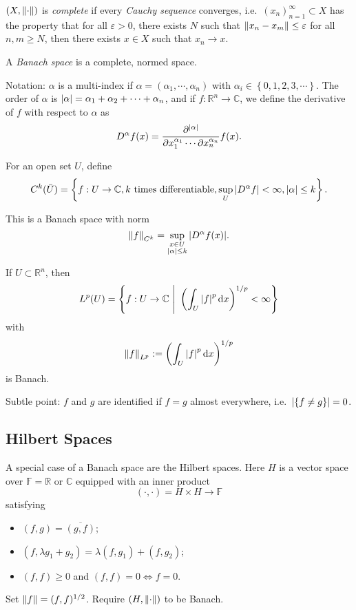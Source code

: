 \documentclass[a4paper,11pt]{article}
\begin{document}
	\begin{defi}
		$(X, \norm{\cdot})$ is \emph{complete} if every \emph{Cauchy sequence} converges, i.e.\ $(x_n)_{n = 1}^{\infty} \subset X$ has the property that for all $\varepsilon > 0$, there exists $N$ such that $\norm{x_n - x_m} \leq \varepsilon$ for all $n,m \geq N$, then there exists $x \in X$ such that $x_n \to x$.  
	\end{defi}

	\begin{defi}
		A \emph{Banach space} is a complete, normed space.
	\end{defi}

	\begin{ex}
		Notation: $\alpha$ is a multi-index if $\alpha = (\alpha_1, \cdots, \alpha_n)$ with $\alpha_i \in \left\{ 0,1,2,3,\cdots \right\}$. The order of $\alpha$ is $\abs{\alpha} = \alpha_1 + \alpha_2 + \cdots + \alpha_n$, and if $f : \mathbb{R}^n \to \mathbb{C}$, we define the derivative of $f$ with respect to $\alpha$ as 
		\[
			D^\alpha f(x) = \frac{\partial ^{\abs{\alpha}}}{\partial x_1 ^{\alpha_1} \cdots \partial x_n ^{\alpha_n}} f(x).
		\]
		 
		For an open set $U$, define
		\[
			C^k (\bar U) = \left\{ f: U \to \mathbb{C}, \text{$k$ times differentiable}, \sup_U \abs{D^\alpha f} < \infty, \abs{\alpha} \leq k\right\}.
		\]

		This is a Banach space with norm 
		\[
			\norm{f}_{C^k} = \sup _{\substack{x\in U\\\abs{\alpha}\leq k}} \abs{D^\alpha f(x)}.
		\]
	\end{ex}

	\begin{ex}
		If $U \subset \mathbb{R}^n$, then 
		\[
			L^p (U) = \left\{ f : U \to \mathbb{C}\ \Bigg|\ \left( \int _U \abs{f}^p \dd{x} \right)^{1/p} < \infty \right\}
		\]
		with 
		\[
			\norm{f} _{L^p} := \left(\int _U \abs{f}^p \dd{x}\right) ^{1/p}
		\]
		is Banach.
	\end{ex}

	\begin{nt}
		Subtle point: $f$ and $g$ are identified if $f = g$ almost everywhere, i.e.\ $\abs{\left\{ f\neq g \right\}} = 0$.
	\end{nt}

	\subsection{Hilbert Spaces}

	A special case of a Banach space are the Hilbert spaces. Here $H$ is a vector space over $\mathbb{F} = \mathbb{R}$ or $\mathbb{C}$ equipped with an inner product
	\[
		(\cdot, \cdot) = H \times H \to \mathbb{F}
	\]
	satisfying
	\begin{itemize}
		\item $(f,g) = \overline{(g,f)}$;
		\item $(f,\lambda g_1 + g_2) = \lambda(f,g_1) + (f,g_2)$;
		\item $(f,f) \geq 0$ and $(f,f) = 0 \Leftrightarrow f = 0$. 
	\end{itemize}
	Set $\norm{f} = (f,f)^{1/2}$. Require $(H,\norm{\cdot})$ to be Banach.
	
\end{document}
